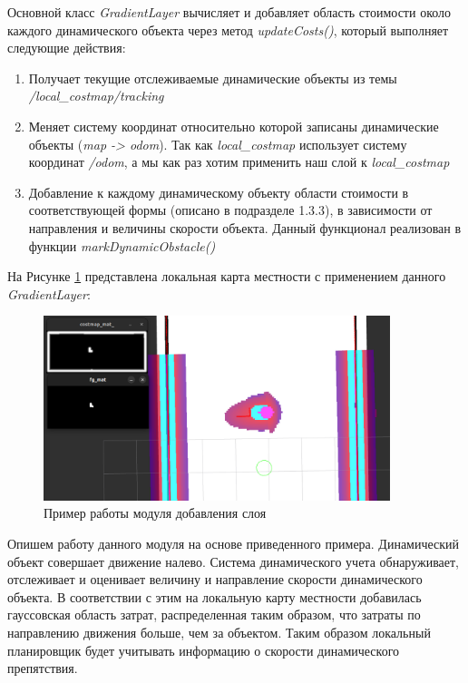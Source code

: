 Основной класс \textit{GradientLayer} вычисляет и добавляет область стоимости около каждого динамического объекта через метод \textit{updateCosts()}, который выполняет следующие действия: 
\begin{enumerate}
    \item Получает текущие отслеживаемые динамические объекты из темы \textit{/local\_costmap/tracking}
    \item Меняет систему координат относительно которой записаны динамические объекты (\textit{map -> odom}). Так как \textit{local\_costmap} использует систему координат \textit{/odom}, а мы как раз хотим применить наш слой к \textit{local\_costmap}
    \item Добавление к каждому динамическому объекту области стоимости в соответствующей формы (описано в подразделе 1.3.3), в зависимости от направления и величины скорости объекта. Данный функционал реализован в функции \textit{markDynamicObstacle()}
\end{enumerate}

На Рисунке \ref*{fig:layer-example} представлена локальная карта местности с применением данного \textit{GradientLayer}:

\begin{figure}[H]
    \centering
    \includegraphics[width=0.9\textwidth]{images/chap_3/layer-example.png}
    \caption{Пример работы модуля добавления слоя}
    \label{fig:layer-example}
\end{figure}

Опишем работу данного модуля на основе приведенного примера. Динамический объект совершает движение налево. Система динамического учета обнаруживает, отслеживает и оценивает величину и направление скорости динамического объекта. В соответствии с этим на локальную карту местности добавилась гауссовская область затрат, распределенная таким образом, что затраты по направлению движения больше, чем за объектом. Таким образом локальный планировщик будет учитывать информацию о скорости динамического препятствия.

